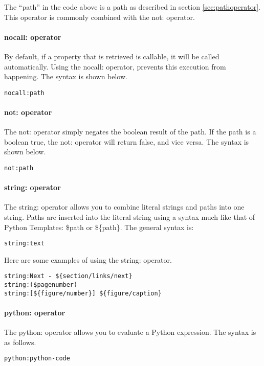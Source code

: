 The ``path'' in the code above is a path as described in section 
\ref{sec:pathoperator}.  This operator is commonly combined with the
not: operator.


\paragraph{nocall: operator}

By default, if a property that is retrieved is callable, it will be
called automatically.  Using the nocall: operator, prevents this 
execution from happening.  The syntax is shown below.
\begin{verbatim}
nocall:path
\end{verbatim}


\paragraph{not: operator}

The not: operator simply negates the boolean result of the path.  If
the path is a boolean true, the not: operator will return false, and
vice versa.  The syntax is shown below.
\begin{verbatim}
not:path
\end{verbatim}


\paragraph{string: operator}

The string: operator allows you to combine literal strings and paths
into one string.  Paths are inserted into the literal string using a
syntax much like that of Python Templates: \$path or \$\{path\}.
The general syntax is:
\begin{verbatim}
string:text
\end{verbatim}

Here are some examples of using the string: operator.
\begin{verbatim}
string:Next - ${section/links/next}
string:($pagenumber)
string:[${figure/number}] ${figure/caption}
\end{verbatim}


\paragraph{python: operator}

The python: operator allows you to evaluate a Python expression.  The
syntax is as follows.
\begin{verbatim}
python:python-code
\end{verbatim}

